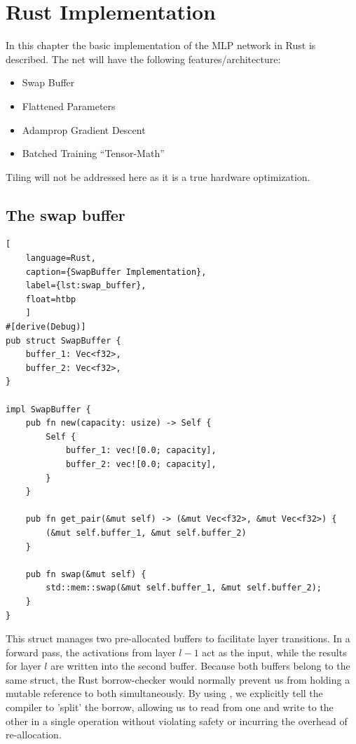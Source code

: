 \chapter{Rust Implementation}
In this chapter the basic implementation of the MLP network in Rust is described. The net will have the following features/architecture:
\begin{itemize}
	\item Swap Buffer
	\item Flattened Parameters
	\item Adamprop Gradient Descent
	\item Batched Training \enquote{Tensor-Math}	%
\end{itemize}
Tiling will not be addressed here as it is a true hardware optimization.
\section{The swap buffer}
\begin{lstlisting}[
	language=Rust, 
	caption={SwapBuffer Implementation}, 
	label={lst:swap_buffer},
	float=htbp
	]
#[derive(Debug)]
pub struct SwapBuffer {
	buffer_1: Vec<f32>,
	buffer_2: Vec<f32>,
}

impl SwapBuffer {
	pub fn new(capacity: usize) -> Self {
		Self {
			buffer_1: vec![0.0; capacity],
			buffer_2: vec![0.0; capacity],
		}
	}
	
	pub fn get_pair(&mut self) -> (&mut Vec<f32>, &mut Vec<f32>) {
		(&mut self.buffer_1, &mut self.buffer_2)
	}
	
	pub fn swap(&mut self) {
		std::mem::swap(&mut self.buffer_1, &mut self.buffer_2);
	}
}
\end{lstlisting}
This struct manages two pre-allocated buffers to facilitate layer transitions. In a forward pass, the activations from layer $l-1$ act as the input, while the results for layer $l$ are written into the second buffer. Because both buffers belong to the same struct, the Rust borrow-checker would normally prevent us from holding a mutable reference to both simultaneously. By using , we explicitly tell the compiler to 'split' the borrow, allowing us to read from one and write to the other in a single operation without violating safety or incurring the overhead of re-allocation.
\newpage
